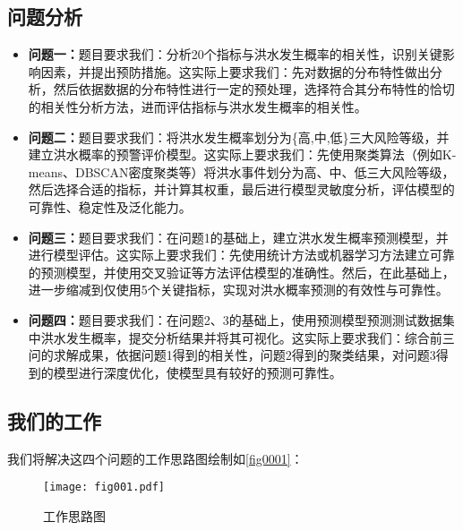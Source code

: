 \documentclass[withoutpreface,bwprint]{cumcmthesis} %
\begin{document}
\subsection{问题分析}
\begin{itemize}
	\item \textbf{问题一：}题目要求我们：分析20个指标与洪水发生概率的相关性，识别关键影响因素，并提出预防措施。这实际上要求我们：先对数据的分布特性做出分析，然后依据数据的分布特性进行一定的预处理，选择符合其分布特性的恰切的相关性分析方法，进而评估指标与洪水发生概率的相关性。
	
		
	\item \textbf{问题二：}题目要求我们：将洪水发生概率划分为\{高,中,低\}三大风险等级，并建立洪水概率的预警评价模型。这实际上要求我们：先使用聚类算法（例如K-means、DBSCAN密度聚类等）将洪水事件划分为高、中、低三大风险等级，然后选择合适的指标，并计算其权重，最后进行模型灵敏度分析，评估模型的可靠性、稳定性及泛化能力。
	
	
	\item \textbf{问题三：}题目要求我们：在问题1的基础上，建立洪水发生概率预测模型，并进行模型评估。这实际上要求我们：先使用统计方法或机器学习方法建立可靠的预测模型，并使用交叉验证等方法评估模型的准确性。然后，在此基础上，进一步缩减到仅使用5个关键指标，实现对洪水概率预测的有效性与可靠性。
	
	\item \textbf{问题四：}题目要求我们：在问题2、3的基础上，使用预测模型预测测试数据集中洪水发生概率，提交分析结果并将其可视化。这实际上要求我们：综合前三问的求解成果，依据问题1得到的相关性，问题2得到的聚类结果，对问题3得到的模型进行深度优化，使模型具有较好的预测可靠性。
	
	
\end{itemize}


\subsection{我们的工作}
我们将解决这四个问题的工作思路图绘制如\autoref{fig0001}：
\begin{figure}[htbp]
	\centering
	\texttt{[image: fig001.pdf]}
	\caption{工作思路图}\label{fig0001}
\end{figure}


\end{document}
